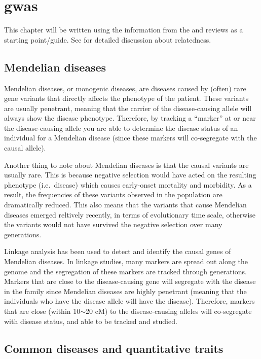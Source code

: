 \chapter{\Gls{gwas}}
\label{cha:gwas}

This chapter will be written using the information from the \citet{Hirschhorn2005} and \citet{McCarthy2008} reviews as a starting point/guide.
See \citet{Astle2009} for detailed discussion about relatedness.

\section{Mendelian diseases}
\label{sec:mendelian_diseases}

Mendelian diseases, or monogenic diseases, are diseases caused by (often) rare gene variants that directly affects the phenotype of the patient.
These variants are usually penetrant, meaning that the carrier of the disease-causing allele will always show the disease phenotype.
Therefore, by tracking a ``marker'' at or near the disease-causing allele you are able to determine the disease status of an individual for a Mendelian disease (since these markers will co-segregate with the causal allele).

Another thing to note about Mendelian diseases is that the causal variants are usually rare.
This is because negative selection would have acted on the resulting phenotype (i.e.\ disease) which causes early-onset mortality and morbidity.
As a result, the frequencies of these variants observed in the population are dramatically reduced.
This also means that the variants that cause Mendelian diseases emerged reltively recently, in terms of evolutionary time scale, otherwise the variants would not have survived the negative selection over many generations.

Linkage analysis has been used to detect and identify the causal genes of Mendelian diseases.
In linkage studies, many markers are spread out along the genome and the segregation of these markers are tracked through generations.
Markers that are close to the disease-causing gene will segregate with the disease in the family since Mendelian diseases are highly penetrant (meaning that the individuals who have the disease allele will have the disease).
Therefore, markers that are close (within 10$\sim$20 cM) to  the disease-causing alleles will co-segregate with disease status, and able to be tracked and studied.

\section{Common diseases and quantitative traits}
\label{sec:common_diseases_and_quantitative_traits}

